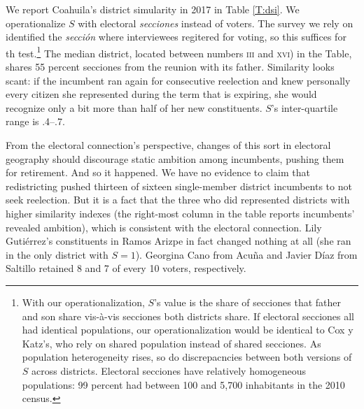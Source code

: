\documentclass[letter,12pt]{article}
\begin{document}
We report Coahuila's district simularity in 2017 in Table \ref{T:dsi}. We operationalize $S$ with electoral \emph{secciones} instead of voters. The survey we rely on identified the \emph{sección} where interviewees regitered for voting, so this suffices for th test.\footnote{With our operationalization, $S$'s value is the share of secciones that father and son share vis-à-vis secciones both districts share. If electoral secciones all had identical populations, our operationalization would be identical to Cox y Katz's, who rely on shared population instead of shared secciones. As population heterogeneity rises, so do discrepacncies between both versions of $S$ across districts. Electoral secciones have relatively homogeneous populations: 99 percent had between 100 and 5,700 inhabitants in the 2010 census.} The median district, located between numbers \textsc{iii} and \textsc{xvi}) in the Table, shares 55 percent secciones from the reunion with its father. Similarity looks scant: if the incumbent ran again for consecutive reelection and knew personally every citizen she represented during the term that is expiring, she would recognize only a bit more than half of her new constituents. $S$'s inter-quartile range is .4--.7.

From the electoral connection's perspective, changes of this sort in electoral geography should discourage static ambition among incumbents, pushing them for retirement. And so it happened. We have no evidence to claim that redistricting pushed thirteen of sixteen single-member district incumbents to not seek reelection. But it is a fact that the three who did represented districts with higher similarity indexes (the right-most column in the table reports incumbents' revealed ambition), which is consistent with the electoral connection. Lily Gutiérrez's constituents in Ramos Arizpe in fact changed nothing at all (she ran in the only district with $S=1$). Georgina Cano from Acuña and Javier Díaz from Saltillo retained 8 and 7 of every 10 voters, respectively.  
\end{document}
